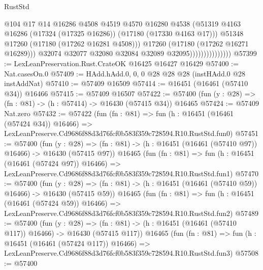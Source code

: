 \begin{lexlean}{RustStd}
\begin{coremodule}
                                      @104
                                      @17
                                      @14
                                      @16286
                                      @4508
                                      @4519
                                      @4570
                                      @16280
                                      @4538
                                      (@51319
                                        @4163
                                        @16286
                                        (@17324 (@17325 @16286))
                                        (@17180 (@17330 @4163 @17)))
                                      @51348
                                      @17260
                                      (@17180 (@17262 @16281 @4508)))
                                    @17260
                                    (@17180 (@17262 @16271 @16289)))
                                  @32074
                                  @32077
                                  @32080
                                  @32084
                                  @32089
                                  @32095)))))))))))))))
@57399 := LexLeanPreservation.Rust.CrateOK @16425 @16427 @16429
@57400 := Nat.casesOn.{0}
@57409 := HAdd.hAdd.{0, 0, 0} @28 @28 @28 (instHAdd.{0} @28 instAddNat)
@57410 := @57409 @16509
@57414 := @16451 (@16461 (@57410 @34)) @16466
@57415 := @57409 @16507
@57422 := @57400 (fun (y : @28) => (fn : @81) -> (h : @57414) -> @16430 (@57415 @34)) @16465
@57424 := @57409 Nat.zero
@57432 := @57422
    (fun (fn : @81) =>
    fun (h : @16451 (@16461 (@57424 @34)) @16466) =>
    LexLeanPreserve.Cd9686f88d3d76fcf0b583f359c728594.R10.RustStd.fun0)
@57451 := @57400
    (fun (y : @28) =>
    (fn : @81) -> (h : @16451 (@16461 (@57410 @97)) @16466) -> @16430 (@57415 @97))
    @16465
    (fun (fn : @81) =>
    fun (h : @16451 (@16461 (@57424 @97)) @16466) =>
    LexLeanPreserve.Cd9686f88d3d76fcf0b583f359c728594.R10.RustStd.fun1)
@57470 := @57400
    (fun (y : @28) =>
    (fn : @81) -> (h : @16451 (@16461 (@57410 @59)) @16466) -> @16430 (@57415 @59))
    @16465
    (fun (fn : @81) =>
    fun (h : @16451 (@16461 (@57424 @59)) @16466) =>
    LexLeanPreserve.Cd9686f88d3d76fcf0b583f359c728594.R10.RustStd.fun2)
@57489 := @57400
    (fun (y : @28) =>
    (fn : @81) -> (h : @16451 (@16461 (@57410 @117)) @16466) -> @16430 (@57415 @117))
    @16465
    (fun (fn : @81) =>
    fun (h : @16451 (@16461 (@57424 @117)) @16466) =>
    LexLeanPreserve.Cd9686f88d3d76fcf0b583f359c728594.R10.RustStd.fun3)
@57508 := @57400

\end{coremodule}
\end{lexlean}

